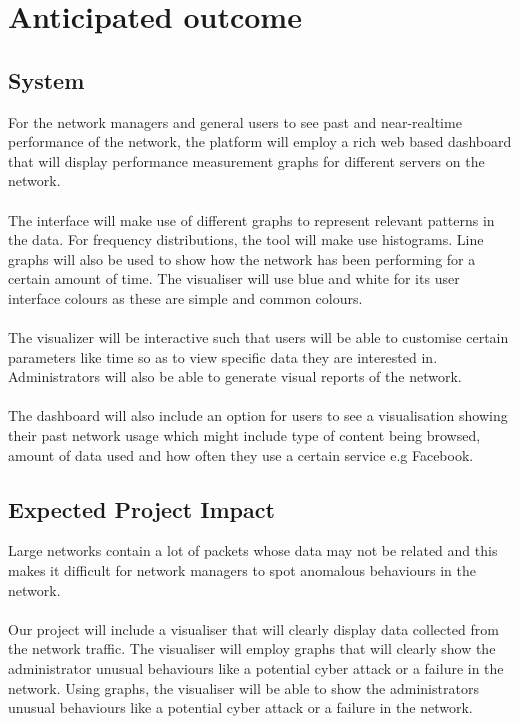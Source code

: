 \section{Anticipated outcome}
\subsection{System}
For the network managers and general users to see past and near-realtime performance of the network, the platform will employ a rich web based dashboard that will display performance measurement graphs for different servers on the network.
\paragraph{}
The interface will make use of different graphs to represent relevant patterns in the data. For frequency distributions, the tool will make use histograms. Line graphs will also be used to show how the network has been performing for a certain amount of time. The visualiser will use blue and white for its user interface colours as these are simple and common colours.
\paragraph{}
The visualizer will be interactive such that users will be able to customise certain parameters like time so as to view specific data they are interested in. Administrators will also be able to generate visual reports of the network.
\paragraph{}
The dashboard will also include an option for users to see a visualisation showing their past network usage which might include type of content being browsed, amount of data used and how often they use a certain service e.g Facebook.

\subsection{Expected Project Impact}
Large networks contain a lot of packets whose data may not be related and this makes it difficult for network managers to spot anomalous behaviours in the network.
\paragraph{}
Our project will include a visualiser that will clearly display data collected from the network traffic. The visualiser will employ graphs that will clearly show the administrator unusual behaviours like a potential cyber attack or a failure in the network.
Using graphs, the visualiser will be able to show the administrators unusual behaviours like a potential cyber attack or a failure in the network.
